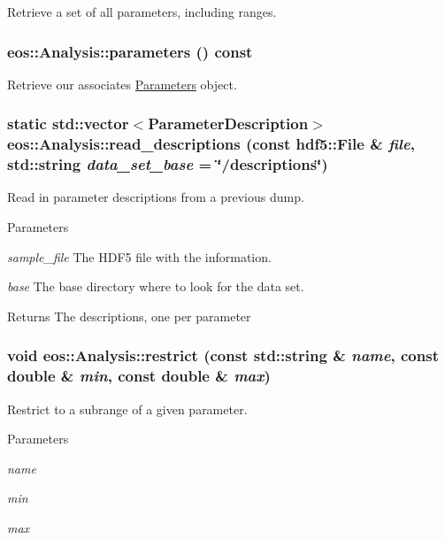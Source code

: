 Retrieve a set of all parameters, including ranges. \hypertarget{classeos_1_1Analysis_a750da19ea2292416b8b42dc2c259935e}{
\subsubsection[{parameters}]{ eos::Analysis::parameters () const}}
\label{classeos_1_1Analysis_a750da19ea2292416b8b42dc2c259935e}


Retrieve our associates \hyperlink{classeos_1_1Parameters}{Parameters} object. \hypertarget{classeos_1_1Analysis_a7f5c6fb49fafda45b0451172b44bf01c}{
\subsubsection[{read\_\-descriptions}]{\setlength{\rightskip}{0pt plus 5cm}static std::vector$<${\bf ParameterDescription}$>$ eos::Analysis::read\_\-descriptions (const {\bf hdf5::File} \& {\em file}, \/  std::string {\em data\_\-set\_\-base} = {\ttfamily \char`\"{}/descriptions\char`\"{}})}}
\label{classeos_1_1Analysis_a7f5c6fb49fafda45b0451172b44bf01c}
Read in parameter descriptions from a previous dump.


\begin{DoxyParams}{Parameters}
\item[{\em sample\_\-file}]The HDF5 file with the information. \item[{\em base}]The base directory where to look for the data set. \end{DoxyParams}
\begin{DoxyReturn}{Returns}
The descriptions, one per parameter 
\end{DoxyReturn}
\hypertarget{classeos_1_1Analysis_a0fa8a2b9d2f9dad49b0e76c83efde3ba}{
\subsubsection[{restrict}]{\setlength{\rightskip}{0pt plus 5cm}void eos::Analysis::restrict (const std::string \& {\em name}, \/  const double \& {\em min}, \/  const double \& {\em max})}}
\label{classeos_1_1Analysis_a0fa8a2b9d2f9dad49b0e76c83efde3ba}
Restrict to a subrange of a given parameter. 
\begin{DoxyParams}{Parameters}
\item[{\em name}]\item[{\em min}]\item[{\em max}]\end{DoxyParams}


